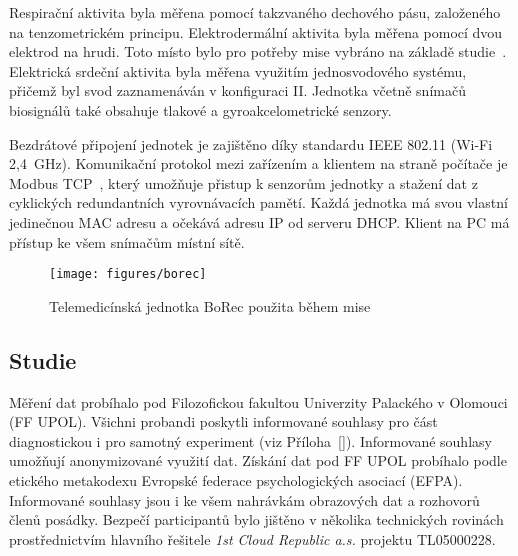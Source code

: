 Respirační aktivita byla měřena pomocí takzvaného dechového pásu, založeného na
tenzometrickém principu. Elektrodermální aktivita byla měřena pomocí dvou
elektrod na hrudi. Toto místo bylo pro potřeby mise vybráno na základě
studie~\cite{Janssen2012}. Elektrická srdeční aktivita byla měřena využitím
jednosvodového systému, přičemž byl svod zaznamenáván v konfiguraci II. Jednotka
včetně snímačů biosignálů také obsahuje tlakové a gyroakcelometrické senzory.

Bezdrátové připojení jednotek je zajištěno díky standardu IEEE 802.11 (Wi-Fi
2,4~GHz). Komunikační protokol mezi zařízením a klientem na straně počítače je
Modbus TCP~\cite{modbus}, který umožňuje přistup k senzorům jednotky a stažení
dat z cyklických redundantních vyrovnávacích pamětí. Každá jednotka má svou
vlastní jedinečnou MAC adresu a očekává adresu IP od serveru DHCP. Klient na PC
má přístup ke všem snímačům místní sítě.

\begin{figure}[h]
    \begin{center}
        \texttt{[image: figures/borec]}
        \caption{Telemedicínská jednotka BoRec použita během mise}
        \label{fig:borec}
    \end{center}
\end{figure}

\subsection{Studie}
\label{subsec:studie}
Měření dat probíhalo pod Filozofickou fakultou Univerzity Palackého v Olomouci
(\gls{FF UPOL}). Všichni probandi poskytli informované souhlasy pro část
diagnostickou i pro samotný experiment (viz Příloha~\ref{}). Informované
souhlasy umožňují anonymizované využití dat. Získání dat pod FF UPOL probíhalo
podle etického metakodexu Evropské federace psychologických asociací
(\gls{EFPA}). Informované souhlasy jsou i ke všem nahrávkám obrazových dat a
rozhovorů členů posádky. Bezpečí participantů bylo jištěno v několika
technických rovinách prostřednictvím hlavního řešitele \textit{1st Cloud
Republic a.s.} projektu TL05000228.